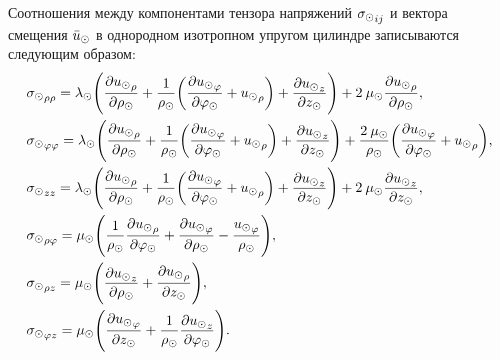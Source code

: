 Соотношения между компонентами тензора напряжений ${\sigma_\odot}_{ij}$ и вектора смещения $\bar{u}_\odot$ в однородном изотропном упругом цилиндре записываются следующим образом:
\begin{equation}\label{tenzor_napr}
\begin{aligned}
&{\sigma_\odot}_{\rho\rho}=\lambda_\odot\Biggl(\frac{\partial {u_\odot}_{\rho}}{\partial \rho_\odot}+\frac{1}{\rho_\odot}\biggl(\frac{\partial {u_\odot}_{\varphi}}{\partial\varphi_\odot}+{u_\odot}_{\rho}\biggr)+\frac{\partial {u_\odot}_{z}}{\partial z_\odot}\Biggr)+2\:\mu_\odot\frac{\partial {u_\odot}_{\rho}}{\partial \rho_\odot},\\
&{\sigma_\odot}_{\varphi\varphi}=\lambda_\odot\Biggl(\frac{\partial {u_\odot}_{\rho}}{\partial \rho_\odot}+\frac{1}{\rho_\odot}\biggl(\frac{\partial {u_\odot}_{\varphi}}{\partial\varphi_\odot}+{u_\odot}_{\rho}\biggr)+\frac{\partial {u_\odot}_{z}}{\partial z_\odot}\Biggr)+\frac{2\:\mu_\odot}{\rho_\odot}\biggl(\frac{\partial {u_\odot}_{\varphi}}{\partial\varphi_\odot}+{u_\odot}_{\rho}\biggr),\\
&{\sigma_\odot}_{zz}=\lambda_\odot\Biggl(\frac{\partial {u_\odot}_{\rho}}{\partial \rho_\odot}+\frac{1}{\rho_\odot}\biggl(\frac{\partial {u_\odot}_{\varphi}}{\partial\varphi_\odot}+{u_\odot}_{\rho}\biggr)+\frac{\partial {u_\odot}_{z}}{\partial z_\odot}\Biggr)+2\:\mu_\odot\frac{\partial {u_\odot}_{z}}{\partial z_\odot},\\
&{\sigma_\odot}_{\rho\varphi}=\mu_\odot\Biggl(\frac{1}{\rho_\odot}\frac{\partial {u_\odot}_{\rho}}{\partial\varphi_\odot}+\frac{\partial {u_\odot}_{\varphi}}{\partial \rho_\odot}-\frac{{u_\odot}_{\varphi}}{\rho_\odot}\Biggr),\\
&{\sigma_\odot}_{\rho z}=\mu_\odot\Biggl(\frac{\partial {u_\odot}_{z}}{\partial \rho_\odot}+\frac{\partial {u_\odot}_{\rho}}{\partial z_\odot}\Biggr),\\
&{\sigma_\odot}_{\varphi z}=\mu_\odot\Biggl(\frac{\partial {u_\odot}_{\varphi}}{\partial z_\odot}+\frac{1}{\rho_\odot}\frac{\partial {u_\odot}_{z}}{\partial \varphi_\odot}\Biggr).
\end{aligned}
\end{equation}

